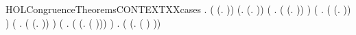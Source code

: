 \begin{SaveVerbatim}{HOLCongruenceTheoremsCONTEXTXXcases}
\HOLTokenTurnstile{} \HOLSymConst{\HOLTokenForall{}}.
         \HOLSymConst{\HOLTokenEquiv{}}
       ( \HOLSymConst{=} (\HOLTokenLambda{}. )) \HOLSymConst{\HOLTokenDisj{}} (\HOLSymConst{\HOLTokenExists{}}.  \HOLSymConst{=} (\HOLTokenLambda{}. )) \HOLSymConst{\HOLTokenDisj{}}
       (\HOLSymConst{\HOLTokenExists{}} . ( \HOLSymConst{=} (\HOLTokenLambda{}.  )) \HOLSymConst{\HOLTokenConj{}}  ) \HOLSymConst{\HOLTokenDisj{}}
       (\HOLSymConst{\HOLTokenExists{}} .
            ( \HOLSymConst{=} (\HOLTokenLambda{}.   \HOLSymConst{\ensuremath{+}}  )) \HOLSymConst{\HOLTokenConj{}}   \HOLSymConst{\HOLTokenConj{}}  ) \HOLSymConst{\HOLTokenDisj{}}
       (\HOLSymConst{\HOLTokenExists{}} .
            ( \HOLSymConst{=} (\HOLTokenLambda{}.   \HOLSymConst{\ensuremath{\parallel}}  )) \HOLSymConst{\HOLTokenConj{}}   \HOLSymConst{\HOLTokenConj{}}  ) \HOLSymConst{\HOLTokenDisj{}}
       (\HOLSymConst{\HOLTokenExists{}} . ( \HOLSymConst{=} (\HOLTokenLambda{}. \HOLConst{\ensuremath{\nu}}  ( ))) \HOLSymConst{\HOLTokenConj{}}  ) \HOLSymConst{\HOLTokenDisj{}}
       \HOLSymConst{\HOLTokenExists{}} . ( \HOLSymConst{=} (\HOLTokenLambda{}.  ( ) )) \HOLSymConst{\HOLTokenConj{}}  
\end{SaveVerbatim}
